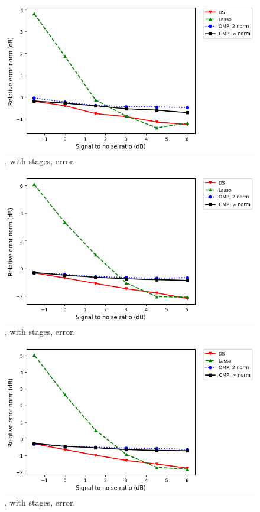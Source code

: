 %
\begin {figure} [H]
\includegraphics [width = \textwidth] {error-small-more-tall-six-usual.png}
\caption {, with  stages, error.}
\end {figure}
%
\begin {figure} [H]
\includegraphics [width = \textwidth] {error-big-more-square-six-usual.png}
\caption {, with  stages, error.}
\end {figure}
%
\begin {figure} [H]
\includegraphics [width = \textwidth] {error-big-more-wide-six-usual.png}
\caption {, with  stages, error.}
\end {figure}
